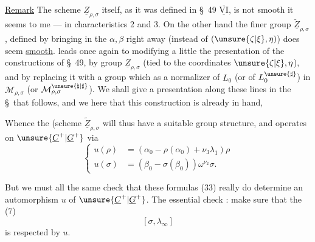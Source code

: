 \uline{Remark} The scheme $\underline Z_{\rho,\sigma}$ itself, as it
was defined in \S\ 49  $\overline{\underline{\mathrm{VI}}}$, is not smooth
it seems to me ---  in characteristics 2 and 3.
On the other hand the finer group $\widetilde{\underline Z}_{\rho,\sigma}$,
defined by bringing in the
$\alpha,\beta$ right away (instead of $(\unsure{\zeta|\xi},\eta)$)
does seem \uline{smooth}.  leads once again
to modifying a little the presentation of the
constructions of \S\ 49, by 
 group $\underline Z_{\rho,\sigma}$ (tied to the coordinates
$\unsure{\zeta|\xi},\eta$), and by replacing it with
a group which   as a
normalizer of $L_0$ (or of $L_0^{\unsure{\sharp}}$) in $\mathcal M_{\rho,\sigma}$
(or $\mathcal M_{\rho,\sigma}^{\unsure{\natural|\sharp}}$). We shall give a presentation along
these lines in the  \S\ that follows, and we
 here that this construction is already in hand,





Whence the  (scheme 
$\widetilde{\underline Z}_{\rho,\sigma}$ will thus have
a suitable group structure, and
operates on $\unsure{\underline C^{+}|\underline G^{+}}$ via
\[
\tag{33}
\left\{\begin{aligned}
u(\rho)&=(\alpha_0-\rho(\alpha_0)+\nu_3\lambda_1)\rho\\
u(\sigma)&=(\beta_0-\sigma(\beta_0))\omega^{\nu_2}\sigma.
\end{aligned}\right.
\]

But we must all the same check that
these formulas (33) really do
determine an automorphism $u$ of $\unsure{\underline C^{+}|\underline G^{+}}$. The
essential check : make sure
that the  (7)
\[
\tag{34}[\sigma,\lambda_\infty]
\]
is respected by $u$.

